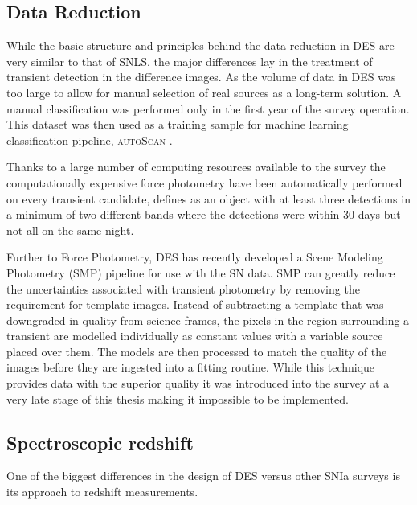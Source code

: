 \subsection{Data Reduction}
While the basic structure and principles behind the data reduction in DES are very similar to that of SNLS, the major differences lay in the treatment of transient detection in the difference images. As the volume of data in DES was too large to allow for manual selection of real sources as a long-term solution. A manual classification was performed only in the first year of the survey operation. This dataset was then used as a training sample for machine learning classification pipeline, \textsc{autoScan} \cite{Goldstein2015}.

Thanks to a large number of computing resources available to the survey the computationally expensive force photometry have been automatically performed on every transient candidate, defines as an object with at least three detections in a minimum of two different bands where the detections were within 30 days but not all on the same night.

Further to Force Photometry, DES has recently developed a Scene Modeling Photometry (SMP) pipeline for use with the SN data. SMP can greatly reduce the uncertainties associated with transient photometry by removing the requirement for template images. Instead of subtracting a template that was downgraded in quality from science frames, the pixels in the region surrounding a transient are modelled individually as constant values with a variable source placed over them. The models are then processed to match the quality of the images before they are ingested into a fitting routine. While this technique provides data with the superior quality it was introduced into the survey at a very late stage of this thesis making it impossible to be implemented.

\subsection{Spectroscopic redshift}
One of the biggest differences in the design of DES versus other SNIa surveys is its approach to redshift measurements.

